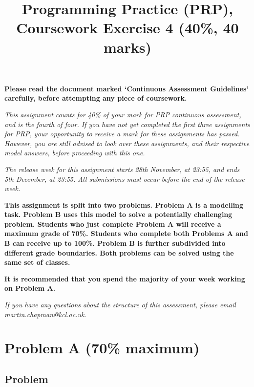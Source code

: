 \documentclass[11pt]{article}
\title{Programming Practice (PRP), Coursework Exercise 4 (40\%, 40 marks)}
\date{}                                           %
\begin{document}
\maketitle

\textbf{Please read the document marked `Continuous Assessment Guidelines' carefully, before attempting any piece of coursework.}

\emph{This assignment counts for 40\% of your mark for PRP continuous assessment, and is the fourth of four. If you have not yet completed the first three assignments for PRP,  your opportunity to receive a mark for these assignments has passed. However, you are still advised to look over these assignments, and their respective model answers, before proceeding with this one.}

\emph{The release week for this assignment starts 28th November, at 23:55, and ends 5th December, at 23:55. All submissions must occur before the end of the release week.}

\textbf{This assignment is split into two problems. Problem A is a modelling task. Problem B uses this model to solve a potentially challenging problem. Students who just complete Problem A will receive a maximum grade of 70\%. Students who complete both Problems A and B can receive up to 100\%. Problem B is further subdivided into different grade boundaries. Both problems can be solved using the same set of classes. }

\textbf{It is recommended that you spend the majority of your week working on Problem A.}

\emph{If you have any questions about the structure of this assessment, please email \\ martin.chapman@kcl.ac.uk.}

\section{Problem A (70\% maximum)}

\subsection{Problem}
\end{document}
